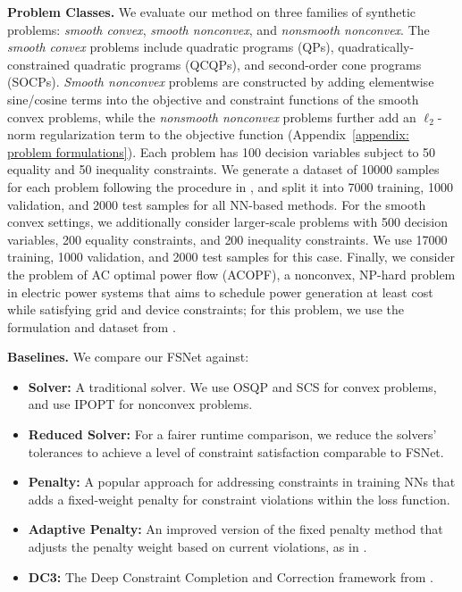 \documentclass{article}
\newcommand{\revise}[1]{{\color{blue} #1}}
\begin{document}
\textbf{Problem Classes.}
We evaluate our method on three families of synthetic problems: \textit{smooth convex}, \textit{smooth nonconvex}, and \textit{nonsmooth nonconvex}. The \textit{smooth convex} problems include quadratic programs (QPs), quadratically-constrained quadratic programs (QCQPs), and second-order cone programs (SOCPs). 
\textit{Smooth nonconvex} problems are constructed by adding elementwise sine/cosine terms into the objective and constraint functions of the smooth convex problems, while the \textit{nonsmooth nonconvex} problems further add an $\ell_2$-norm regularization term to the objective function (Appendix~\ref{appendix: problem formulations}). 
Each problem has 100 decision variables subject to 50 equality and 50 inequality constraints. 
We generate a dataset of 10000 samples for each problem following the procedure in \cite{donti2021dc3, liang2024homeomorphic}, and split it into  7000 training, 1000 validation, and 2000 test samples for all NN-based methods.
For the smooth convex settings, we additionally consider larger-scale problems with 500 decision variables, 200 equality
constraints, and 200 inequality constraints.
We use 17000 training, 1000 validation, and 2000 test samples for this case.
Finally, we consider the problem of AC optimal power flow (ACOPF), a nonconvex, NP-hard problem in electric power systems that aims to schedule power generation at least cost while satisfying grid and device constraints; for this problem, we use the formulation and dataset from \cite{klamkin2025pglearn}.


\textbf{Baselines.} We compare our FSNet against:
\begin{itemize}[leftmargin=20pt, topsep=3pt]
    \item \textbf{Solver:} A traditional solver. We use OSQP \cite{stellato2020osqp} and SCS \cite{odonoghue:21} for convex problems, and use IPOPT \cite{wachter2006implementation} for nonconvex problems.     
    \item \textbf{Reduced Solver:} For a fairer runtime comparison, we reduce the solvers’ tolerances to achieve a level of constraint satisfaction comparable to FSNet.
    \item \textbf{Penalty:} A popular approach for addressing constraints in training NNs that adds a fixed-weight penalty for constraint violations within the loss function.
    \item \textbf{Adaptive Penalty:} An improved version of the fixed penalty method that adjusts the penalty weight based on current violations, as in \cite{fioretto2021lagrangian}.
    \item \textbf{DC3:} The Deep Constraint Completion and Correction framework from \cite{donti2021dc3}. 
\end{itemize}
\end{document}
